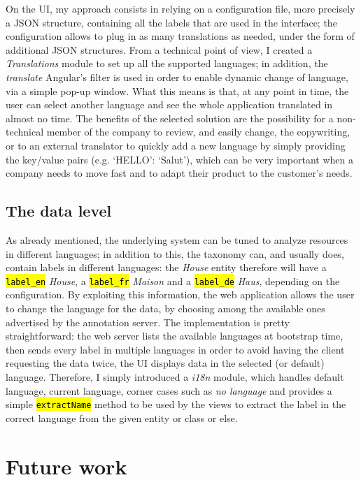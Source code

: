 \documentclass[12pt,oneside,svgnames]{memoir}
\let\OldTexttt\texttt
\renewcommand{\texttt}[1]{\OldTexttt{\hl{#1}}}
\begin{document}
On the UI, my approach consists in relying on a configuration file, more
precisely a JSON structure, containing all the labels that are used in
the interface; the configuration allows to plug in as many translations
as needed, under the form of additional JSON structures. From a
technical point of view, I created a \emph{Translations} module to set
up all the supported languages; in addition, the \emph{translate}
Angular's filter is used in order to enable dynamic change of language,
via a simple pop-up window. What this means is that, at any point in
time, the user can select another language and see the whole application
translated in almost no time. The benefits of the selected solution are
the possibility for a non-technical member of the company to review, and
easily change, the copywriting, or to an external translator to quickly
add a new language by simply providing the key/value pairs (e.g.
`HELLO': `Salut'), which can be very important when a company needs to
move fast and to adapt their product to the customer's needs.

\subsection{The data level}\label{the-data-level}

As already mentioned, the underlying system can be tuned to analyze
resources in different languages; in addition to this, the taxonomy can,
and usually does, contain labels in different languages: the
\emph{House} entity therefore will have a \texttt{label\_en}
\emph{House}, a \texttt{label\_fr} \emph{Maison} and a
\texttt{label\_de} \emph{Haus}, depending on the configuration. By
exploiting this information, the web application allows the user to
change the language for the data, by choosing among the available ones
advertised by the annotation server. The implementation is pretty
straightforward: the web server lists the available languages at
bootstrap time, then sends every label in multiple languages in order to
avoid having the client requesting the data twice, the UI displays data
in the selected (or default) language. Therefore, I simply introduced a
\emph{i18n} module, which handles default language, current language,
corner cases such as \emph{no language} and provides a simple
\texttt{extractName} method to be used by the views to extract the label
in the correct language from the given entity or class or else.

\section{Future work}\label{future-work}
\end{document}
